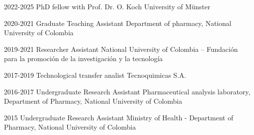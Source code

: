 

\begin{cvskills}

  \cvskill
    {2022-2025} %
    {PhD fellow with Prof. Dr. O. Koch} %
    {University of Münster} %

  \cvskill
    {2020-2021} %
    {Graduate Teaching Assistant} %
    {Department of pharmacy, National University of Colombia} %

  \cvskill
    {2019-2021} %
    {Researcher Assistant} %
    {National University of Colombia – Fundación para la promoción de la investigación y la tecnología} %

  \cvskill
    {2017-2019} %
    {Technological transfer analist} %
    {Tecnoquimicas S.A.} %

  \cvskill
    {2016-2017} %
    {Undergraduate Research Assistant} %
    {Pharmaceutical analysis laboratory, Department of Pharmacy,  National University of Colombia} %

  \cvskill
    {2015} %
    {Undergraduate Research Assistant} %
    {Ministry of Health - Department of Pharmacy,  National University of Colombia} %

\end{cvskills}
